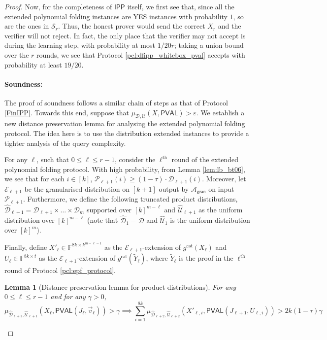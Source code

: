 \documentclass[10pt,a4paper]{article}
\newtheorem{lemma}[theorem]{Lemma}
\newcommand{\PVAL}{\mathsf{PVAL}}
\newcommand{\IPP}{\mathsf{IPP}}
\newcommand{\gran}{\mathsf{gran}}
\newcommand{\F}{\mathbb{F}}
\newcommand{\sU}{\mathcal{U}}
\newcommand{\sD}{\mathcal{D}}
\newcommand{\sA}{\mathcal{A}}
\newcommand{\sP}{\mathcal{P}}
\begin{document}
\begin{proof}
Now, for the completeness of $\IPP$ itself, we first see that, since all the extended polynomial folding instances are YES instances with probability $1$, so are the ones in $\mathcal{S}_r$. Thus, the honest prover would send the correct $X_r$ and the verifier will not reject. In fact, the only place that the verifier may not accept is during the learning step, with probability at most $1/20r$; taking a union bound over the $r$ rounds, we see that Protocol \ref{pcl:dfipp_whitebox_pval} accepts with probability at least $19/20$.

\paragraph*{Soundness:} The proof of soundness follows a similar chain of steps as that of Protocol \ref{FinIPP}. Towards this end, suppose that $\mu_{\sD,\sU}(X,\PVAL) > \varepsilon$. We establish a new distance preservation lemma for analysing the extended polynomial folding protocol. The idea here is to use the distribution extended instances to provide a tighter analysis of the query complexity. 

For any $\ell$, such that $0 \leq \ell \leq r-1$, consider the $\ell^{\text{th}}$ round of the extended polynomial folding protocol. With high probability, from Lemma \ref{lem:lb_bt06}, we see that for each $i \in [k]$, $\sP_{\ell+1}(i) \geq (1-\tau) \cdot \sD_{\ell+1}(i)$. Moreover, let $\mathcal{E}_{\ell+1}$ be the granularised distribution on $[k+1]$ output by $\sA_\gran$ on input $\sP_{\ell+1}$. Furthermore, we define the following truncated product distributions, $\widehat{\sD}_{\ell+1} = \sD_{\ell+1} \times \dots \times \sD_m$ supported over $[k]^{m-\ell}$ and $\widehat{\sU}_{\ell+1}$ as the uniform distribution over $[k]^{m-\ell}$ (note that $\widehat{\sD}_1 = \sD$ and $\widehat{\sU}_1$ is the uniform distribution over $[k]^m$). 

Finally, define $X'_\ell \in \F^{8k \times k^{m-\ell-1}}$ as the $\mathcal{E}_{\ell+1}$-extension of $g^\mathsf{cat}(X_\ell)$ and $U_\ell \in \F^{8k \times t}$ as the $\mathcal{E}_{\ell+1}$-extension of $g^\mathsf{cat}(\widetilde{Y}_{\ell})$, where $\widetilde{Y}_{\ell}$ is the proof in the $\ell^\text{th}$ round of Protocol \ref{pcl:epf_protocol}.

\begin{lemma}[Distance preservation lemma for product distributions]
    \label{lem:dpl_product}
    For any $0 \leq \ell \leq r-1$ and for any $\gamma > 0$,
    \begin{equation*}
        \mu_{\widehat{\sD}_{\ell+1},\widehat{\sU}_{\ell+1}} (X_\ell, \PVAL(J_\ell,\Vec{v}_\ell)) > \gamma \implies 
        \sum_{i=1}^{8k} \mu_{\widehat{\sD}_{\ell+2}, \widehat{\sU}_{\ell+2}} (X'_{\ell,i}, \PVAL(J_{\ell+1},U_{\ell,i})) > 2k(1-\tau)\gamma
    \end{equation*}
\end{lemma}


\end{proof}
\end{document}

